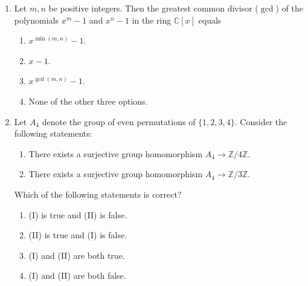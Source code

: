 \documentclass[11pt, a4paper]{article}
\begin{document}
\begin{enumerate}
  \item Let $m, n$ be positive integers. Then the greatest common divisor ($\gcd$) of the polynomials $x^m - 1$ and $x^n - 1$ in the ring $\mathbb{C}[x]$ equals
  \begin{enumerate}[label=(\alph*)]
    \item $x^{\min(m,n)} - 1$.
    \item $x - 1$.
    \item $x^{\gcd(m,n)} - 1$.
    \item None of the other three options.
  \end{enumerate}

  \item Let $A_4$ denote the group of even permutations of $\{1, 2, 3, 4\}$. Consider the following statements:
  \begin{enumerate}[label=(\Roman*)]
    \item There exists a surjective group homomorphism $A_4 \to \mathbb{Z}/4\mathbb{Z}$.
    \item There exists a surjective group homomorphism $A_4 \to \mathbb{Z}/3\mathbb{Z}$.
  \end{enumerate}
  Which of the following statements is correct?
  \begin{enumerate}[label=(\alph*)]
    \item (I) is true and (II) is false.
    \item (II) is true and (I) is false.
    \item (I) and (II) are both true.
    \item (I) and (II) are both false.
  \end{enumerate}
\end{enumerate}
\end{document}
